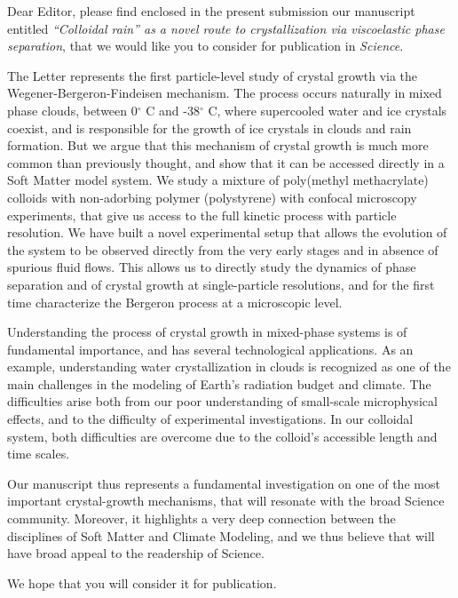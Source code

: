 \documentclass[11pt]{article}
\begin{document}
\doublespacing

\noindent
Dear Editor,
\vskip 0.3cm
please find enclosed in the present submission our manuscript entitled
\emph{``Colloidal rain'' as a novel route to crystallization via viscoelastic phase separation},
that we would like you to consider for publication in \emph{Science}.

The Letter represents the first particle-level study of crystal growth via the Wegener-Bergeron-Findeisen mechanism.
The process occurs naturally in mixed phase clouds, between 0$^\circ$ C and -38$^\circ$ C, where supercooled water and ice crystals coexist,
and is responsible for the growth of ice crystals in clouds and rain formation. But we argue that this
mechanism of crystal growth is much more common than previously thought,
and show that it can be accessed directly in a Soft Matter model system.
We study a mixture of poly(methyl methacrylate) colloids with non-adorbing polymer (polystyrene)
with confocal microscopy experiments, that give us access to the full kinetic process with
particle resolution. We have built a novel experimental setup that allows the evolution of
the system to be observed directly from the very early stages and in absence of spurious fluid flows.
This allows us to directly study the dynamics of phase separation and of crystal growth at single-particle resolutions,
and for the first time characterize the Bergeron process at a microscopic level.

Understanding the process of crystal growth in mixed-phase systems is of fundamental importance,
and has several technological applications. As an example, understanding
water crystallization in clouds is recognized as one of the main challenges in the
modeling of Earth's radiation budget and climate. The difficulties arise both from our poor understanding of small-scale microphysical effects,
and to the difficulty of experimental investigations. In our colloidal system, both
difficulties are overcome due to the colloid's accessible length and time scales.

Our manuscript thus represents a fundamental investigation on one of the most important
crystal-growth mechanisms, that will resonate with the broad Science community.
Moreover, it highlights a very deep connection between the disciplines of Soft Matter and Climate Modeling,
and we thus believe that will have broad appeal to the readership of Science.

We hope that you will consider it for publication.
\end{document}
